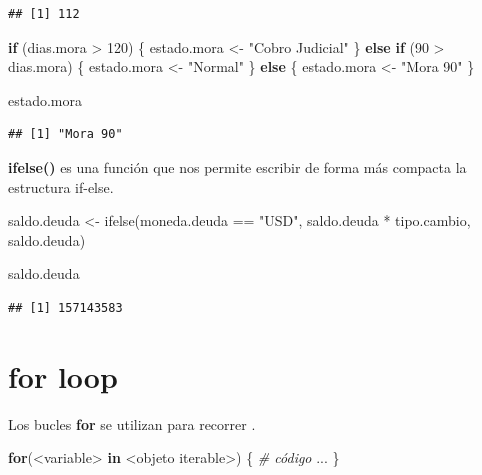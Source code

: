 \documentclass[
  12pt,
]{book}
\newenvironment{Shaded}{\begin{snugshade}}{\end{snugshade}}
\newcommand{\CommentTok}[1]{\textcolor[rgb]{0.56,0.35,0.01}{\textit{#1}}}
\newcommand{\ControlFlowTok}[1]{\textcolor[rgb]{0.13,0.29,0.53}{\textbf{#1}}}
\newcommand{\DecValTok}[1]{\textcolor[rgb]{0.00,0.00,0.81}{#1}}
\newcommand{\FunctionTok}[1]{\textcolor[rgb]{0.00,0.00,0.00}{#1}}
\newcommand{\NormalTok}[1]{#1}
\newcommand{\OtherTok}[1]{\textcolor[rgb]{0.56,0.35,0.01}{#1}}
\newcommand{\SpecialCharTok}[1]{\textcolor[rgb]{0.00,0.00,0.00}{#1}}
\newcommand{\StringTok}[1]{\textcolor[rgb]{0.31,0.60,0.02}{#1}}
\begin{document}
\begin{verbatim}
## [1] 112
\end{verbatim}

\begin{Shaded}
\begin{Highlighting}[]
\ControlFlowTok{if}\NormalTok{ (dias.mora }\SpecialCharTok{\textgreater{}} \DecValTok{120}\NormalTok{) \{}
\NormalTok{  estado.mora }\OtherTok{\textless{}{-}} \StringTok{"Cobro Judicial"}
\NormalTok{\} }\ControlFlowTok{else} \ControlFlowTok{if}\NormalTok{ (}\DecValTok{90} \SpecialCharTok{\textgreater{}}\NormalTok{ dias.mora) \{}
\NormalTok{  estado.mora }\OtherTok{\textless{}{-}} \StringTok{"Normal"}
\NormalTok{\} }\ControlFlowTok{else}\NormalTok{ \{}
\NormalTok{  estado.mora }\OtherTok{\textless{}{-}} \StringTok{"Mora 90"}
\NormalTok{\}}

\NormalTok{estado.mora}
\end{Highlighting}
\end{Shaded}

\begin{verbatim}
## [1] "Mora 90"
\end{verbatim}

\textbf{ifelse()} es una función que nos permite escribir de forma más compacta la estructura if-else.

\begin{Shaded}
\begin{Highlighting}[]
\NormalTok{saldo.deuda }\OtherTok{\textless{}{-}} \FunctionTok{ifelse}\NormalTok{(moneda.deuda }\SpecialCharTok{==} \StringTok{"USD"}\NormalTok{, saldo.deuda }\SpecialCharTok{*}\NormalTok{ tipo.cambio, saldo.deuda)}

\NormalTok{saldo.deuda}
\end{Highlighting}
\end{Shaded}

\begin{verbatim}
## [1] 157143583
\end{verbatim}

\hypertarget{for-loop}{%
\section{\texorpdfstring{\textbf{for loop}}{for loop}}\label{for-loop}}

Los bucles \textbf{for} se utilizan para recorrer .

\begin{Shaded}
\begin{Highlighting}[]
\ControlFlowTok{for}\NormalTok{(}\SpecialCharTok{\textless{}}\NormalTok{variable}\SpecialCharTok{\textgreater{}} \ControlFlowTok{in} \SpecialCharTok{\textless{}}\NormalTok{objeto iterable}\SpecialCharTok{\textgreater{}}\NormalTok{) \{}
  \CommentTok{\# código}
\NormalTok{  ...}
\NormalTok{\}}
\end{Highlighting}
\end{Shaded}
\end{document}
